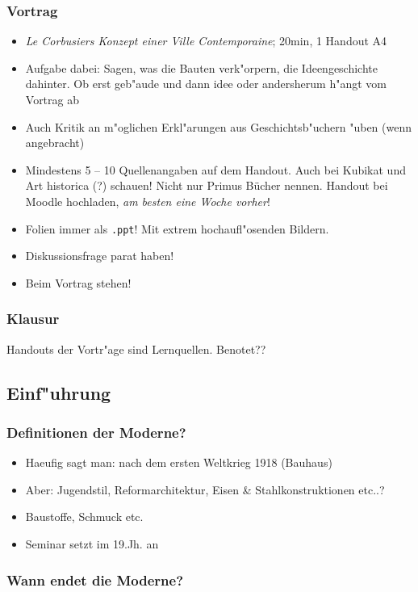 \documentclass[emulatestandardclasses]{scrartcl}
\begin{document}
\subsubsection{Vortrag}

\begin{itemize}
    \item \emph{Le Corbusiers Konzept einer Ville Contemporaine}; 20min, 1 Handout A4
    \item Aufgabe dabei: Sagen, was die Bauten verk"orpern, die Ideengeschichte dahinter. Ob erst geb"aude und dann idee oder andersherum h"angt vom Vortrag ab
    \item Auch Kritik an m"oglichen Erkl"arungen aus Geschichtsb"uchern "uben (wenn angebracht)
    \item Mindestens 5 -- 10 Quellenangaben auf dem Handout. Auch bei Kubikat und Art historica (?) schauen! Nicht nur Primus Bücher nennen. Handout bei Moodle hochladen, \emph{am besten eine Woche vorher}! 
    \item Folien immer als \texttt{.ppt}! Mit extrem hochaufl"osenden Bildern.
    \item Diskussionsfrage parat haben!
    \item Beim Vortrag stehen!
\end{itemize}



\subsubsection{Klausur}
Handouts der Vortr"age sind Lernquellen.
Benotet??

\subsection{Einf"uhrung}
\subsubsection{Definitionen der Moderne?}
\begin{itemize}
    \item Haeufig sagt man: nach dem ersten Weltkrieg 1918 (Bauhaus)
    \item Aber: Jugendstil, Reformarchitektur, Eisen \& Stahlkonstruktionen etc..?
    \item Baustoffe, Schmuck etc.
    \item Seminar setzt im 19.Jh. an
\end{itemize}

\subsubsection{Wann endet die Moderne?}
\end{document}
